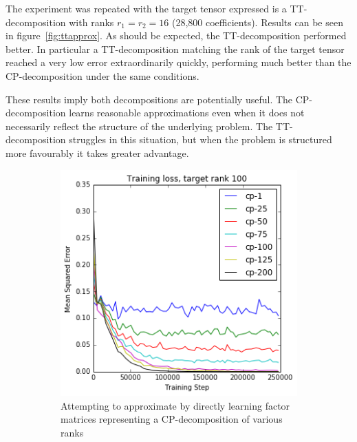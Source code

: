 The experiment was repeated with the target tensor expressed is a TT-decomposition with ranks
\(r_1 = r_2 = 16\) (28,800 coefficients). Results can be seen in figure~\ref{fig:ttapprox}.
As should be expected, the TT-decomposition performed better. In particular a TT-decomposition
matching the rank of the target tensor reached a very low error extraordinarily quickly,
performing much better than the CP-decomposition under the same conditions.

These results imply both decompositions are potentially useful. The CP-decomposition learns
 reasonable approximations even when it does not necessarily reflect the
structure of the underlying problem. The TT-decomposition struggles in this situation,
but when the problem is structured more favourably it takes greater advantage.


\begin{figure}
\centering
\begin{subfigure}[t]{0.45\textwidth}
	\includegraphics[width=\textwidth]{tensors/cp100cpapprox}
	\caption{Attempting to approximate by directly learning factor matrices representing a 
		CP-decomposition of various ranks}
	\label{fig:cpcpapprox}
\end{subfigure}
~
\begin{subfigure}[t]{0.45\textwidth}

\end{subfigure}
\end{figure}
